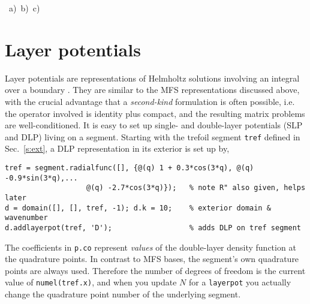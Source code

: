 \bfi %

\mbox{%
\hspace{-5ex}
a)
b)
c)
}%
\efi

\section{Layer potentials}
\label{s:layer}

Layer potentials are representations of Helmholtz solutions
involving an integral over a boundary \cite{coltonkress}.
They are similar to the MFS representations discussed above, with the
crucial advantage that a {\em second-kind}
formulation is often possible, i.e. the operator involved is
identity plus compact, and the resulting matrix problems are well-conditioned.
It is easy to set up single- and double-layer potentials (SLP and
DLP) living on a segment.
Starting with the trefoil segment {\tt tref} defined in Sec.~\ref{s:ext}, a DLP
representation in its exterior is set up by,
\begin{verbatim}
tref = segment.radialfunc([], {@(q) 1 + 0.3*cos(3*q), @(q) -0.9*sin(3*q),...
                   @(q) -2.7*cos(3*q)});   % note R" also given, helps later
d = domain([], [], tref, -1); d.k = 10;    % exterior domain & wavenumber
d.addlayerpot(tref, 'D');                  % adds DLP on tref segment
\end{verbatim}
The coefficients in {\tt p.co} represent {\em values} of the double-layer
density function at the quadrature points.
In contrast to MFS bases,
the segment's own quadrature points are always used. Therefore the
number of degrees of freedom is the current value of {\tt numel(tref.x)},
and when you update $N$ for a {\tt layerpot} you actually
change the quadrature point number of the underlying segment.

